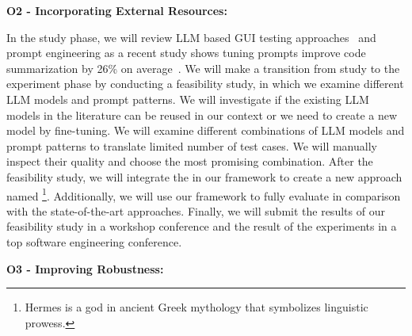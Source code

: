 

\bigskip
\noindent
\textbf{O2 - Incorporating External Resources:}  

\bigskip
\noindent
In the study phase, we will review LLM based GUI testing approaches~\cite{Zimmermann:GPT3GUITest:2023:ICSTW, liu:GUIInputLLM:ICSE:2023} and prompt engineering 
as a recent study shows tuning prompts improve code summarization  by 26\% on average~\cite{wang:prompt:FSE:2023}.
We will make a transition from study to the experiment phase by conducting a feasibility study, in which we examine different LLM models and prompt patterns.
We will investigate if the existing LLM models in the literature can be reused in our context or we need to create a new model by fine-tuning.
We will examine different combinations of LLM models and prompt patterns to translate limited number of test cases.
We will manually inspect their quality and choose the most promising combination.
After the feasibility study, we will integrate the \llmtranslator in our framework to create a new \testreuse approach named \llmtool\footnote{Hermes is a god in ancient Greek mythology that symbolizes linguistic prowess.}.
Additionally, we will use our \tme framework to fully evaluate \llmtool in comparison with the state-of-the-art \testreuse approaches.
Finally, we will submit the results of our  feasibility study in a workshop conference and the result of the \testreuse experiments in a top software engineering conference. 




\bigskip
\noindent
\textbf{O3 - Improving Robustness:}  

